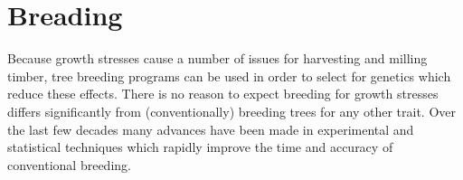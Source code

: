 \section{Breading}
Because growth stresses cause a number of issues for harvesting and milling
timber, tree breeding programs can be used in order to select for
genetics which reduce these effects. There is no reason to expect  breeding for
growth stresses differs significantly from (conventionally) breeding trees for
any other trait. Over the last few decades many advances have been made in
experimental and statistical techniques which rapidly improve the time and
accuracy of conventional breeding.